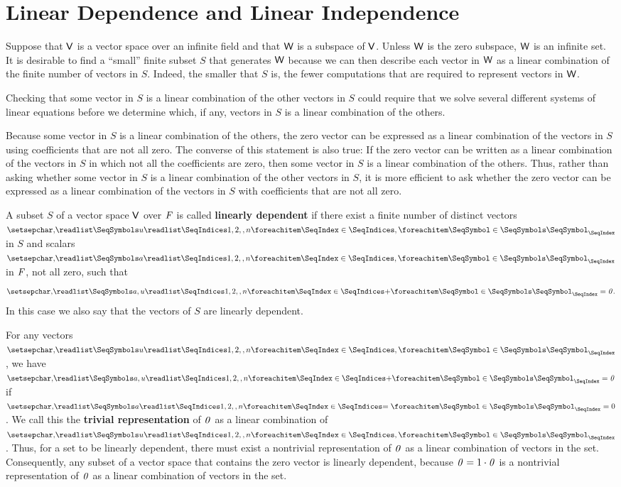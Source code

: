 \section{Linear Dependence and Linear Independence}\label{sec:1.5}

\begin{note}
	Suppose that \(\mathsf{V}\) is a vector space over an infinite field and that \(\mathsf{W}\) is a subspace of \(\mathsf{V}\).
	Unless \(\mathsf{W}\) is the zero subspace, \(\mathsf{W}\) is an infinite set.
	It is desirable to find a ``small'' finite subset \(S\) that generates \(\mathsf{W}\) because we can then describe each vector in \(\mathsf{W}\) as a linear combination of the finite number of vectors in \(S\).
	Indeed, the smaller that \(S\) is, the fewer computations that are required to represent vectors in \(\mathsf{W}\).

	Checking that some vector in \(S\) is a linear combination of the other vectors in \(S\) could require that we solve several different systems of linear equations before we determine which, if any, vectors in \(S\) is a linear combination of the others.

	Because some vector in \(S\) is a linear combination of the others, the zero vector can be expressed as a linear combination of the vectors in \(S\) using coefficients that are not all zero.
	The converse of this statement is also true:
	If the zero vector can be written as a linear combination of the vectors in \(S\) in which not all the coefficients are zero, then some vector in \(S\) is a linear combination of the others.
	Thus, rather than asking whether some vector in \(S\) is a linear combination of the other vectors in \(S\), it is more efficient to ask whether the zero vector can be expressed as a linear combination of the vectors in \(S\) with coefficients that are not all zero.
\end{note}

\begin{defn}\label{1.5.1}
	A subset \(S\) of a vector space \(\mathsf{V}\) over \(\mathit{F}\) is called \textbf{linearly dependent} if there exist a finite number of distinct vectors \(\seq{u}{1,2,,n}\) in \(S\) and scalars \(\seq{a}{1,2,,n}\) in \(\mathit{F}\), not all zero, such that
	\[
		\seq[+]{a,u}{1,2,,n} = \zv.
	\]
	In this case we also say that the vectors of \(S\) are linearly dependent.
\end{defn}

\begin{defn}\label{1.5.2}
	For any vectors \(\seq{u}{1,2,,n}\), we have \(\seq[+]{a,u}{1,2,,n} = \zv\) if \(\seq[=]{a}{1,2,,n} = 0\).
	We call this the \textbf{trivial representation} of \(\mathit{0}\) as a linear combination of \(\seq{u}{1,2,,n}\).
	Thus, for a set to be linearly dependent, there must exist a nontrivial representation of \(\mathit{0}\) as a linear combination of vectors in the set.
	Consequently, any subset of a vector space that contains the zero vector is linearly dependent, because \(\mathit{0} = 1 \cdot \mathit{0}\) is a nontrivial representation of \(\mathit{0}\) as a linear combination of vectors in the set.
\end{defn}

